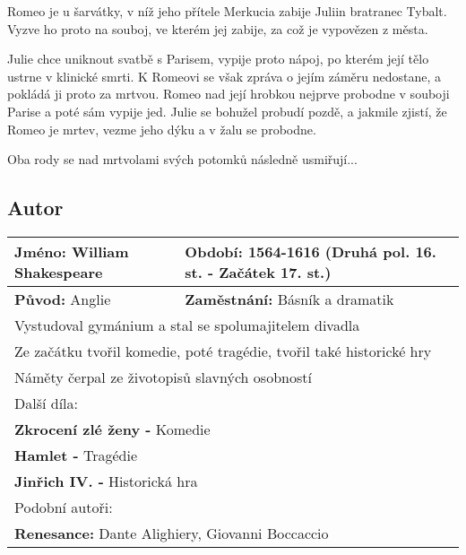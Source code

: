 Romeo je u šarvátky, v níž jeho přítele Merkucia zabije Juliin bratranec Tybalt.
Vyzve ho proto na souboj, ve kterém jej zabije, za což je vypovězen z města.

Julie chce uniknout svatbě s Parisem, vypije proto nápoj, po kterém její tělo ustrne v klinické smrti.
K Romeovi se však zpráva o jejím záměru nedostane, a pokládá ji proto za mrtvou.
Romeo nad její hrobkou nejprve probodne v souboji Parise a poté sám vypije jed.
Julie se bohužel probudí pozdě, a jakmile zjistí, že Romeo je mrtev, vezme jeho dýku a v žalu se probodne.

Oba rody se nad mrtvolami svých potomků následně usmiřují...

\subsection*{Autor}
\begin{tabularx}{\linewidth}{l|l}
  \textbf{Jméno:} William Shakespeare & \textbf{Období:} 1564-1616 (Druhá pol. 16. st. - Začátek 17. st.) \\
  \hline
  \textbf{Původ:} Anglie              & \textbf{Zaměstnání:} Básník a dramatik                            \\
  \hline
  \multicolumn{2}{l}{Vystudoval gymánium a stal se spolumajitelem divadla}                                \\
  \multicolumn{2}{l}{Ze začátku tvořil komedie, poté tragédie, tvořil také historické hry}                \\
  \multicolumn{2}{l}{Náměty čerpal ze životopisů slavných osobností}                                      \\
  \hline
  \multicolumn{2}{l}{Další díla:}                                                                         \\
  \multicolumn{2}{l}{\textbf{Zkrocení zlé ženy -} Komedie}                                                \\
  \multicolumn{2}{l}{\textbf{Hamlet -} Tragédie}                                                          \\
  \multicolumn{2}{l}{\textbf{Jinřich IV. -} Historická hra}                                               \\
  \hline
  \multicolumn{2}{l}{Podobní autoři:}                                                                     \\
  \multicolumn{2}{l}{\textbf{Renesance:} Dante Alighiery, Giovanni Boccaccio}                             \\
\end{tabularx}
